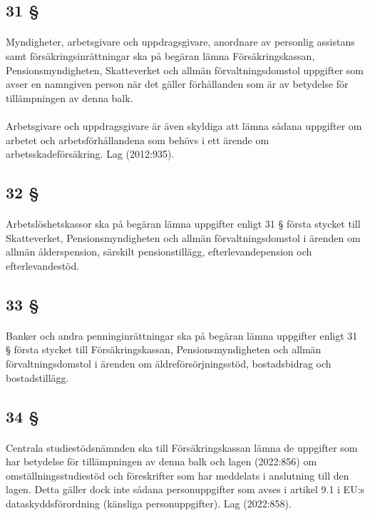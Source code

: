 \documentclass[a4paper,notitlepage,openany,10pt]{book}
\begin{document}
\subsection*{31 §}
\paragraph*{}
Myndigheter, arbetsgivare och uppdragsgivare, anordnare av personlig assistans samt försäkringsinrättningar ska på begäran lämna Försäkringskassan, Pensionsmyndigheten, Skatteverket och allmän förvaltningsdomstol uppgifter som avser en namngiven person när det gäller förhållanden som är av betydelse för tillämpningen av denna balk.
\paragraph*{}
Arbetsgivare och uppdragsgivare är även skyldiga att lämna sådana uppgifter om arbetet och arbetsförhållandena som behövs i ett ärende om arbetsskadeförsäkring.
Lag (2012:935).
\subsection*{32 §}
\paragraph*{}
Arbetslöshetskassor ska på begäran lämna uppgifter enligt 31 § första stycket till Skatteverket, Pensionsmyndigheten och allmän förvaltningsdomstol i ärenden om allmän ålderspension, särskilt pensionstillägg, efterlevandepension och efterlevandestöd.
\subsection*{33 §}
\paragraph*{}
Banker och andra penninginrättningar ska på begäran lämna uppgifter enligt 31 § första stycket till Försäkringskassan, Pensionsmyndigheten och allmän förvaltningsdomstol i ärenden om äldreförsörjningsstöd, bostadsbidrag och bostadstillägg.
\subsection*{34 §}
\paragraph*{}
Centrala studiestödsnämnden ska till Försäkringskassan lämna de uppgifter som har betydelse för tillämpningen av denna balk och lagen (2022:856) om omställningsstudiestöd och föreskrifter som har meddelats i anslutning till den lagen. Detta gäller dock inte sådana personuppgifter som avses i artikel 9.1 i EU:s dataskyddsförordning (känsliga personuppgifter).
Lag (2022:858).
\end{document}
